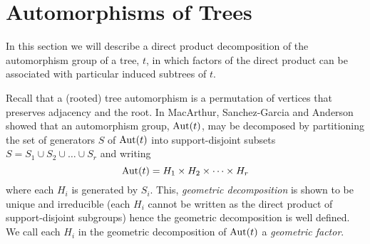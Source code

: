 \begin{figure}[ht]
\centering
{}
\end{figure}

\section{Automorphisms of Trees}\label{sec:aut}
In this section we will describe a direct product decomposition of the automorphism group of a tree, $t$, in which factors of the direct product can be associated with particular induced subtrees of $t$.  

Recall that a (rooted) tree automorphism is a permutation of vertices that preserves adjacency and the root. In \cite{macarthur} MacArthur, 
Sanchez-Garcia and Anderson showed that an 
automorphism group, $\operatorname{Aut}(t)$, may be decomposed by partitioning the set of generators $S$ of $\operatorname{Aut}(t)$ into support-disjoint subsets 
$S = S_1 \cup S_2 \cup \dots \cup S_r$ and writing
\begin{equation}\label{eq:geometric}
 \operatorname{Aut}(t) = H_1 \times H_2 \times \dots \times H_r
\end{equation}
where each $H_i$ is generated by $S_i$.  This, \emph{geometric decomposition} is shown \cite{macarthur} to be unique and 
irreducible (each $H_i$ cannot be written as the direct product of support-disjoint subgroups) hence the geometric 
decomposition is well defined. We call each $H_i$ in the geometric decomposition of $\operatorname{Aut}(t)$ a \emph{geometric factor}. 

